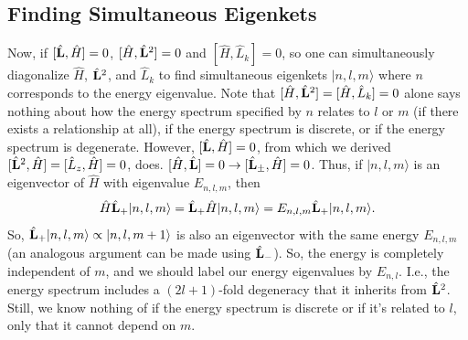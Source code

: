 \subsection{Finding Simultaneous Eigenkets}
Now, if $[\hat{\mathbf{L}}, \hat{H}]=0$, $[\hat{H}, \hat{\mathbf{L}}^2]=0$ and $[\hat{H}, \hat{L}_k]=0$, so one can simultaneously diagonalize $\hat{H}$, $\hat{\mathbf{L}}^2$, and $\hat{L}_k$ to find simultaneous eigenkets $|n, l, m\rangle$ where $n$ corresponds to the energy eigenvalue. Note that $[\hat{H}, \hat{\mathbf{L}}^2]=[\hat{H}, \hat{L}_k]=0$ alone says nothing about how the energy spectrum specified by $n$ relates to $l$ or $m$ (if there exists a relationship at all), if the energy spectrum is discrete, or if the energy spectrum is degenerate. However, $[\hat{\mathbf{L}}, \hat{H}]=0$, from which we derived $[\hat{\mathbf{L}}^2, \hat{H}]=[\hat{L}_z,\hat{H}]=0$, does. $[\hat{H},\hat{\mathbf{L}}]=0\rightarrow [\hat{\mathbf{L}}_{\pm},\hat{H}]=0$. Thus, if $|n,l,m\rangle$ is an eigenvector of $\hat{H}$ with eigenvalue $E_{n,l,m}$, then
\begin{align*}
    \hat{H}\hat{\mathbf{L}}_+|n,l,m\rangle = \hat{\mathbf{L}}_+\hat{H}|n,l,m\rangle = E_{n,l,m}\hat{\mathbf{L}}_+|n,l,m\rangle.
\end{align*} 
So, $\hat{\mathbf{L}}_+|n,l,m\rangle\propto|n,l,m+1\rangle$ is also an eigenvector with the same energy $E_{n,l,m}$ (an analogous argument can be made using $\hat{\mathbf{L}}_-$). So, the energy is completely independent of $m$, and we should label our energy eigenvalues by $E_{n,l}$. I.e., the energy spectrum includes a $(2l+1)$-fold degeneracy that it inherits from $\hat{\mathbf{L}}^2$. Still, we know nothing of if the energy spectrum is discrete or if it's related to $l$, only that it cannot depend on $m$.\\

